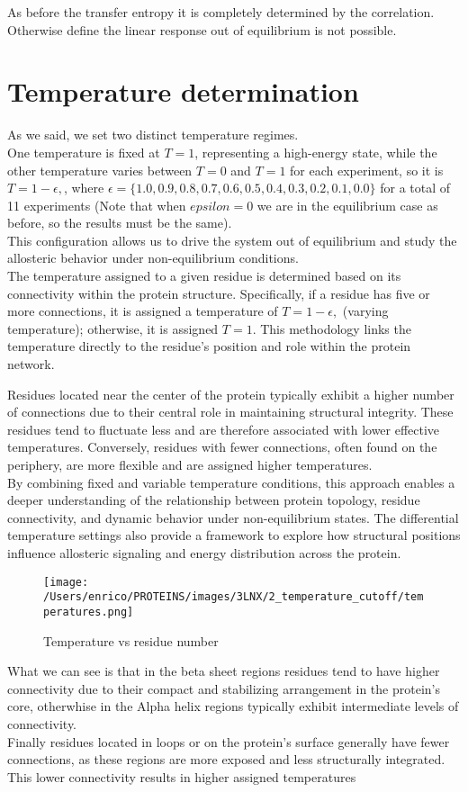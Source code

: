 \documentclass[English, Lau, oneside]{sapthesis}
\begin{document}
As before the transfer entropy it is completely determined by the correlation.
Otherwise define the linear response out of equilibrium is not possible.


\newpage
\section{Temperature determination}
\noindent As we said, we set two distinct temperature regimes.\\
One temperature is fixed at \( T = 1 \), representing a high-energy state, while the other temperature varies between \( T = 0 \) and \( T = 1 \) for each experiment, so it is \( T = 1 - \epsilon,\),
where \( \epsilon = \{1.0, 0.9, 0.8, 0.7, 0.6, 0.5, 0.4, 0.3, 0.2, 0.1, 0.0\} \) for a total of 11 experiments (Note that when  \( epsilon = 0 \) we are in the equilibrium case as before, so the results must be the same).\\
This configuration allows us to drive the system out of equilibrium and study the allosteric behavior under non-equilibrium conditions.\\
The temperature assigned to a given residue is determined based on its connectivity within the protein structure. Specifically, if a residue has five or more connections, it is assigned a temperature of \( T = 1 - \epsilon,\)  (varying temperature);
otherwise, it is assigned \( T = 1 \). This methodology links the temperature directly to the residue's position and role within the protein network.

Residues located near the center of the protein typically exhibit a higher number of connections due to their central role in maintaining structural integrity. These residues tend to fluctuate less and are therefore associated with lower effective temperatures. Conversely, residues with fewer connections, often found on the periphery, are more flexible and are assigned higher temperatures.\\
By combining fixed and variable temperature conditions, this approach enables a deeper understanding of the relationship between protein topology, residue connectivity, and dynamic behavior under non-equilibrium states. The differential temperature settings also provide a framework to explore how structural positions influence allosteric signaling and energy distribution across the protein.\\
\begin{figure}[h!]
    \centering
    \texttt{[image: /Users/enrico/PROTEINS/images/3LNX/2\_temperature\_cutoff/temperatures.png]}
    \caption{Temperature vs residue number}
\end{figure}
What we can see is that in the beta sheet regions residues tend to have higher connectivity due to their compact and stabilizing arrangement in the protein's core, otherwhise in the Alpha helix regions typically exhibit intermediate levels of connectivity.\\
Finally residues located in loops or on the protein's surface generally have fewer connections, as these regions are more exposed and less structurally integrated.
This lower connectivity results in higher assigned temperatures
\end{document}
